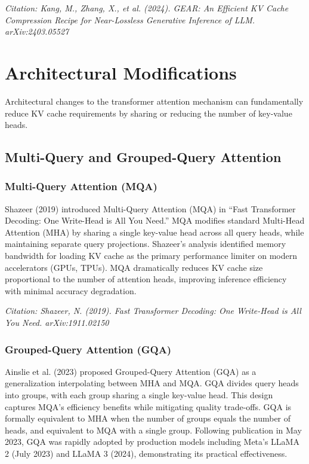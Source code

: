 \documentclass[11pt,letterpaper]{article}
\begin{document}
\textit{Citation: Kang, M., Zhang, X., et al. (2024). GEAR: An Efficient KV Cache Compression Recipe for Near-Lossless Generative Inference of LLM. arXiv:2403.05527}

\section{Architectural Modifications}

Architectural changes to the transformer attention mechanism can fundamentally reduce KV cache requirements by sharing or reducing the number of key-value heads.

\subsection{Multi-Query and Grouped-Query Attention}

\subsubsection{Multi-Query Attention (MQA)}

Shazeer (2019) introduced Multi-Query Attention (MQA) in ``Fast Transformer Decoding: One Write-Head is All You Need.'' MQA modifies standard Multi-Head Attention (MHA) by sharing a single key-value head across all query heads, while maintaining separate query projections. Shazeer's analysis identified memory bandwidth for loading KV cache as the primary performance limiter on modern accelerators (GPUs, TPUs). MQA dramatically reduces KV cache size proportional to the number of attention heads, improving inference efficiency with minimal accuracy degradation.

\textit{Citation: Shazeer, N. (2019). Fast Transformer Decoding: One Write-Head is All You Need. arXiv:1911.02150}

\subsubsection{Grouped-Query Attention (GQA)}

Ainslie et al. (2023) proposed Grouped-Query Attention (GQA) as a generalization interpolating between MHA and MQA. GQA divides query heads into groups, with each group sharing a single key-value head. This design captures MQA's efficiency benefits while mitigating quality trade-offs. GQA is formally equivalent to MHA when the number of groups equals the number of heads, and equivalent to MQA with a single group. Following publication in May 2023, GQA was rapidly adopted by production models including Meta's LLaMA 2 (July 2023) and LLaMA 3 (2024), demonstrating its practical effectiveness.
\end{document}

